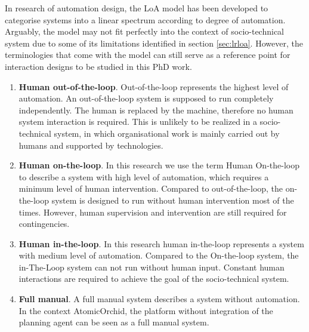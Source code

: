 In research of automation design, the \ac{LoA} model has been developed to categorise systems into a linear spectrum according to degree of automation. Arguably, the model may not fit perfectly into the context of socio-technical system due to some of its limitations identified in section \ref{sec:lrloa}. However, the terminologies that come with the model can still serve as a reference point for interaction designs to be studied in this PhD work.


\begin{enumerate}
\item \textbf{Human out-of-the-loop}.
Out-of-the-loop represents the highest level of automation. An out-of-the-loop system is supposed to run completely independently. The human is replaced by the machine, therefore no human system interaction is required. This is unlikely to be realized in a socio-technical system, in which organisational work is mainly carried out by humans and supported by technologies.  \\

\item \textbf{Human on-the-loop}.
In this research we use the term Human On-the-loop to describe a system with high level of automation, which requires a minimum level of human intervention. Compared to out-of-the-loop, the on-the-loop system is designed to run without human intervention most of the times. However, human supervision and intervention are still required for contingencies. 

\item \textbf{Human in-the-loop}.
In this research human in-the-loop represents a system with medium level of automation. Compared to the On-the-loop system, the in-The-Loop system can not run without human input. Constant human interactions are required to achieve the goal of the socio-technical system. \\

\item \textbf{Full manual}.
A full manual system describes a system without automation. In the context AtomicOrchid, the platform without integration of the planning agent can be seen as a full manual system. 

\end{enumerate}

